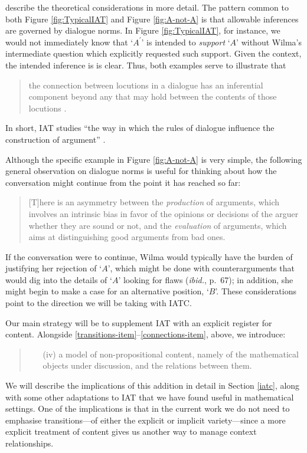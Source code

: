 \documentclass[smallextended,oneside]{svjour3}       %
\let\cite\citep
\newcommand\nothing[1]{#1}
\let\paragraph\nothing
\begin{document}
\citet{visser2011correspondence} describe the theoretical
considerations in more detail.
The pattern common to both Figure \ref{fig:TypicalIAT} and Figure
\ref{fig:A-not-A} is that allowable inferences are governed by
dialogue norms.  In Figure \ref{fig:TypicalIAT}, for instance, we
would not immediately know that `$A^\prime$' is intended to \emph{support} `$A$'
without Wilma's intermediate question which explicitly requested such
support.  Given the context, the intended
inference is is clear.
Thus, both examples serve to illustrate that
\begin{quote}
the connection between locutions in a dialogue has an inferential
component beyond any that may hold between the contents of those
locutions \cite{reed2011dialogues}.
\end{quote}
In short, IAT studies ``the way in which the rules of dialogue
influence the construction of argument''
\cite{budzynska2016theoretical}.

Although the specific example in Figure \ref{fig:A-not-A} is very
simple, the following general observation on dialogue norms is useful for thinking about how the
conversation might continue from the point it has reached so far:
\begin{quote}
[T]here is an asymmetry between the \emph{production} of arguments,
which involves an intrinsic bias in favor of the opinions or decisions
of the arguer whether they are sound or not, and the \emph{evaluation}
of arguments, which aims at distinguishing good arguments from bad
ones. \cite[p.~72]{mercier2011humans}
\end{quote}
If the conversation were to continue, Wilma would typically have the
burden of justifying her rejection of `$A$', which might be done with
counterarguments that would dig into the details of `$A$' looking for
flaws (\emph{ibid.}, p.~67); in addition, she might begin to make a
case for an alternative position, `$B$'.  These considerations point to
the direction we will be taking with IATC.

\paragraph{Our main strategy will be to supplement IAT with an explicit register for content.}
Alongside \ref{transitions-item}--\ref{connections-item}, above, we
introduce:
\begin{quote}
\begin{itemize}[label=(\roman*)]
\item[(iv)] a model of non-propositional content, namely of the
  mathematical objects under discussion, and the relations between
  them.
\end{itemize}
\end{quote}
We will describe the implications of this addition in detail in
Section \ref{iatc}, along with some other adaptations to IAT that we
have found useful in mathematical settings.  One of the implications
is that in the current work we do not need to emphasise transitions---of
either the explicit or implicit variety---since a more explicit
treatment of content gives us another way to manage context
relationships.
\end{document}

